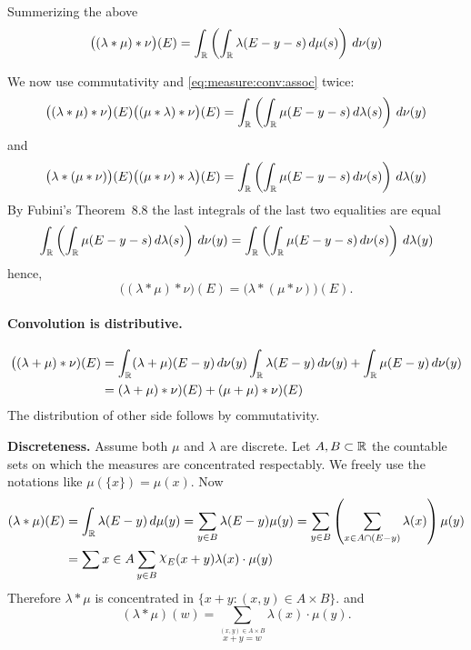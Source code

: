\begin{enumerate}
\begin{itemize}
Summerizing the above
\begin{equation} \label{eq:measure:conv:assoc}
\bigl((\lambda\ast \mu)\ast \nu\bigr)(E)
= \int_{\mathbb{R}} \left(\int_{\mathbb{R}}\lambda(E-y-s)\,d\mu(s)\right)\,d\nu(y)
\end{equation}

We now use commutativity and \eqref{eq:measure:conv:assoc} twice:
\begin{equation*}
\bigl((\lambda\ast \mu)\ast \nu\bigr)(E)
\bigl((\mu\ast \lambda)\ast \nu\bigr)(E)
= \int_{\mathbb{R}} \left(\int_{\mathbb{R}}\mu(E-y-s)\,d\lambda(s)\right)\,d\nu(y)
\end{equation*}
and
\begin{equation*}
\bigl(\lambda\ast (\mu\ast \nu)\bigr)(E)
\bigl((\mu\ast \nu)\ast \lambda\bigr)(E)
= \int_{\mathbb{R}} \left(\int_{\mathbb{R}}\mu(E-y-s)\,d\nu(s)\right)\,d\lambda(y)
\end{equation*}
By Fubini's Theorem~8.8 the last integrals of the last two equalities
are equal
\begin{equation*}
  \int_{\mathbb{R}} \left(\int_{\mathbb{R}}\mu(E-y-s)\,d\lambda(s)\right)\,d\nu(y)
= \int_{\mathbb{R}} \left(\int_{\mathbb{R}}\mu(E-y-s)\,d\nu(s)\right)\,d\lambda(y)
\end{equation*}
hence,
\begin{equation*}
  \bigl((\lambda\ast \mu)\ast \nu\bigr)(E) 
= \bigl(\lambda\ast (\mu\ast \nu)\bigr)(E).
\end{equation*}

\paragraph{Convolution is distributive.}
\begin{align*}
\bigl((\lambda+\mu)\ast \nu)(E)
&= \int_{\mathbb{R}} (\lambda+\mu)(E-y)\,d\nu(y)
     \int_{\mathbb{R}} \lambda(E-y)\,d\nu(y)
   + \int_{\mathbb{R}} \mu(E-y)\,d\nu(y) \\
&=  (\lambda+\mu)\ast \nu)(E)
  + (\mu+\mu)\ast \nu)(E)
\end{align*}
The distribution of other side follows by commutativity.

\textbf{Discreteness.}
Assume both \(\mu\) and \(\lambda\) are discrete.
Let \(A,B\subset\mathbb{R}\) the countable sets on which the measures are concentrated
respectably. We freely use the notations like \(\mu(\{x\})=\mu(x)\).
Now
\begin{align*}
(\lambda\ast\mu)(E)
&= \int_{\R} \lambda(E-y)\,d\mu(y)
 = \sum_{y\in B} \lambda(E-y)\mu(y)
 = \sum_{y\in B} \left(\sum_{x\in A\cap (E-y)}\lambda(x)\right)\mu(y) \\
&= \sum{x\in A}\sum_{y\in B} \chhi_E(x+y)\lambda(x)\cdot\mu(y)
\end{align*}
Therefore \(\lambda\ast\mu\) is concentrated in \(\{x+y: (x,y)\in A\times B\}\).
and 
\begin{equation*}
(\lambda\ast\mu)(w) = \sum_{\stackrel{(x,y)\in  A\times B}{x+y=w}} \lambda(x)\cdot\mu(y).
\end{equation*}



\end{itemize}
\end{enumerate}
